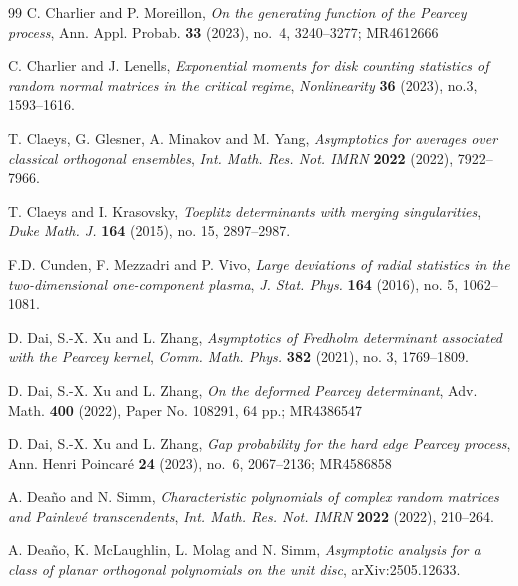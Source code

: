 \documentclass[reqno]{amsart}
\newcommand{\1}{\mathds{1}}
\numberwithin{equation}{section}
\theoremstyle{definition}
\begin{document}
\begin{thebibliography}{99}
C. Charlier and P. Moreillon, \emph{On the generating function of the Pearcey process}, Ann. Appl. Probab. {\bf 33} (2023), no.~4, 3240--3277; MR4612666


 C. Charlier and J. Lenells, \emph{Exponential moments for disk counting statistics of random normal matrices in the critical regime}, \textit{Nonlinearity} \textbf{36} (2023), no.3, 1593--1616.




 T. Claeys, G. Glesner, A. Minakov and M. Yang, \emph{Asymptotics for averages over classical orthogonal ensembles}, \textit{Int. Math. Res. Not. IMRN} \textbf{2022} (2022), 7922--7966.

 T. Claeys and I. Krasovsky, \emph{Toeplitz determinants with merging singularities}, \textit{Duke Math. J.} \textbf{164} (2015), no. 15, 2897--2987.


 F.D. Cunden, F. Mezzadri and P. Vivo, \emph{Large deviations of radial statistics in the two-dimensional one-component plasma}, \textit{J. Stat. Phys.} \textbf{164} (2016), no. 5, 1062--1081.

 D. Dai, S.-X. Xu and L. Zhang, \emph{Asymptotics of Fredholm determinant associated with the Pearcey kernel}, \textit{Comm. Math. Phys.} \textbf{382} (2021), no. 3, 1769--1809.

D. Dai, S.-X. Xu and L. Zhang, \emph{On the deformed Pearcey determinant}, Adv. Math. {\bf 400} (2022), Paper No. 108291, 64 pp.; MR4386547

D. Dai, S.-X. Xu and L. Zhang, \emph{Gap probability for the hard edge Pearcey process}, Ann. Henri Poincar\'e{} {\bf 24} (2023), no.~6, 2067--2136; MR4586858

 A. Dea\~{n}o and N. Simm, \emph{Characteristic polynomials of complex random matrices and Painlev\'{e} transcendents}, \textit{Int. Math. Res. Not. IMRN} \textbf{2022} (2022), 210--264.

A. Dea\~{n}o, K. McLaughlin, L. Molag and N. Simm, \emph{Asymptotic analysis for a class of planar orthogonal polynomials on the unit disc}, arXiv:2505.12633.


\end{thebibliography}
\end{document}
